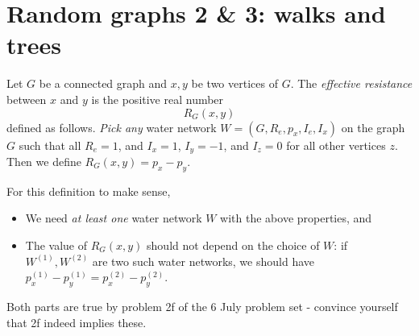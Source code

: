 \documentclass[11pt,fleqn]{book} %
\begin{document}
\newpage 
 \chapter{Random graphs 2 \& 3:  walks and trees}
\setcounter{problem}{0}


\begin{definition}
Let $G$ be a connected graph and $x,y$ be two vertices of $G$. The \textit{effective resistance} between $x$ and $y$ is the positive real number 
$$R_G(x,y)$$
defined as follows. \textit{Pick any} water network $W=(G,R_e,p_x,I_e,I_x)$ on the graph $G$ such that all $R_e=1$, and $I_x=1$, $I_y=-1$, and $I_z=0$ for all other vertices $z$. Then we define $R_G(x,y)=p_x-p_y$.
\end{definition}

For this definition to make sense, 
\begin{itemize}
 \item We need \textit{at least one} water network $W$ with the above properties, and
 \item The value  of $R_G(x,y)$ should not depend on the choice of $W$: if $W^{(1)},W^{(2)}$ are two such water networks, we should have $p_x^{(1)}-p_y^{(1)}=p_x^{(2)}-p_y^{(2)}$.
\end{itemize}
Both parts are true by problem 2f of the 6 July problem set - convince yourself that 2f indeed implies these.
\end{document}
